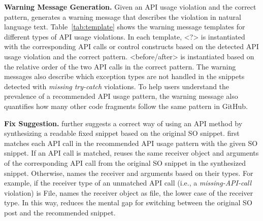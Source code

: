 {\bf Warning Message Generation.} Given an API usage violation and the correct pattern, {\tool} generates a warning message that describes the violation in natural language text. Table~\ref{tab:template} shows the warning message templates for different types of API usage violations. In each template, {\textless?\textgreater} is instantiated with the corresponding API calls or control constructs based on the detected API usage violation and the correct pattern. {\textless before/after\textgreater} is instantiated based on the relative order of the two API calls in the correct pattern. The warning messages also describe which exception types are not handled in the snippets detected with {\em missing try-catch} violations. To help users understand the prevalence of a recommended API usage pattern, the warning message also quantifies how many other code fragments follow the same pattern in GitHub. 

{\bf Fix Suggestion.} {\tool} further suggests a correct way of using an API method by synthesizing a readable fixed snippet based on the original SO snippet. {\tool} first matches each API call in the recommended API usage pattern with the given SO snippet. If an API call is matched, {\tool} reuses the same receiver object and arguments of the corresponding API call from the original SO snippet in the synthesized snippet. Otherwise, {\tool} names the receiver and arguments based on their types. For example, if the receiver type of an unmatched API call (i.e., a {\em missing-API-call} violation) is {\ttt File}, {\tool} names the receiver object as {\ttt file}, the lower case of the receiver type. In this way, {\tool} reduces the mental gap for switching between the original SO post and the recommended snippet.

